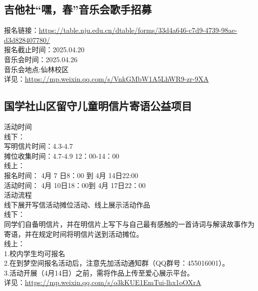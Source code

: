 \documentclass[letterpaper, 12pt]{article}
\begin{document}
\begin{multicols}{2}
\subsection{吉他社“嘿，春”音乐会歌手招募}
报名链接：\url{https://table.nju.edu.cn/dtable/forms/33d4a646-c7d9-4739-98ae-d3d828407780/}
\\报名截止时间：2025.04.20
\\音乐会时间：2025.04.26
\\音乐会地点:仙林校区
\\详见：\url{https://mp.weixin.qq.com/s/VnkGMbW1A5LhWR9-zr-9XA}

\subsection{国学社山区留守儿童明信片寄语公益项目}
活动时间
\\线下：
\\写明信片时间：4.3-4.7
\\摊位收集时间：4.7-4.9  12：00-14：00
\\线上：
\\报名时间： 4月 7 日8：00 到 4月 14日22:00
\\活动时间： 4月 10日18：00到 4月 17日22：00
\\活动流程
\\线下展开写信活动摊位活动、线上展示活动作品
\\线下：
\\同学们自备明信片，并在明信片上写下与自己最有感触的一首诗词与解读故事作为寄语，并在规定时间将明信片送到活动摊位。
\\线上：
\\1.校内学生均可报名
\\2.在到梦空间报名活动后，注意先加活动通知群（QQ群号：455016001）。
\\3.活动开展（4月14日）之前，需将作品上传至爱心展示平台。
\\详见：\url{https://mp.weixin.qq.com/s/o3kKUE1EmTui-lhx1oOXrA}

\end{multicols}
\end{document}
